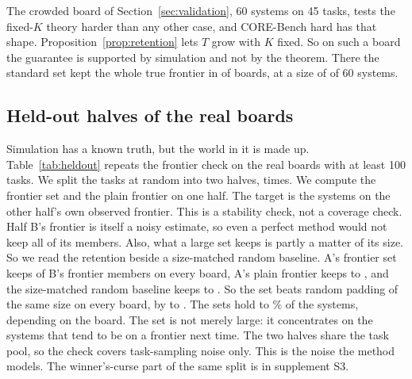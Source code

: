 \documentclass[11pt]{article}
\begin{document}
The crowded board of Section~\ref{sec:validation}, 60 systems on 45 tasks, tests the fixed-$K$ theory harder than any other case, and CORE-Bench hard has that shape. Proposition~\ref{prop:retention} lets $T$ grow with $K$ fixed. So on such a board the guarantee is supported by simulation and not by the theorem. There the standard set kept the whole true frontier in \NumValCrowdedJoint{} of boards, at a size of \NumValSetSizeSixty{} of 60 systems.

\subsection{Held-out halves of the real boards}
\label{sec:heldout}
\begin{table}[!tbp]
\centering\small
\resizebox{0.9\textwidth}{!}{}
\caption{Stability check on the HAL boards with at least 100 tasks, \NumHeldoutR{} random half splits each. The frontier set and the plain frontier are computed on half A. The target is the systems on half B's own observed frontier. Columns: the share of those systems kept by A's frontier set, by A's plain frontier, and by a size-matched random baseline. The baseline is A's plain frontier plus randomly chosen systems, up to the size of A's frontier set. The fourth column is the mean size of A's set.}
\label{tab:heldout}
\end{table}
Simulation has a known truth, but the world in it is made up. Table~\ref{tab:heldout} repeats the frontier check on the real boards with at least 100 tasks. We split the tasks at random into two halves, \NumHeldoutR{} times. We compute the frontier set and the plain frontier on one half. The target is the systems on the other half's own observed frontier. This is a stability check, not a coverage check. Half B's frontier is itself a noisy estimate, so even a perfect method would not keep all of its members. Also, what a large set keeps is partly a matter of its size. So we read the retention beside a size-matched random baseline. A's frontier set keeps \NumHeldoutKeptMin{} of B's frontier members on every board, A's plain frontier keeps \NumHeldoutPlainMin{} to \NumHeldoutPlainMax{}, and the size-matched random baseline keeps \NumHeldoutRandomMin{} to \NumHeldoutRandomMax{}. So the set beats random padding of the same size on every board, by \NumHeldoutBeatRandomMin{} to \NumHeldoutBeatRandomMax{}. The sets hold \NumHeldoutSetShareMin{} to \NumHeldoutSetShareMax\% of the systems, depending on the board. The set is not merely large: it concentrates on the systems that tend to be on a frontier next time. The two halves share the task pool, so the check covers task-sampling noise only. This is the noise the method models. The winner's-curse part of the same split is in supplement S3.
\end{document}
